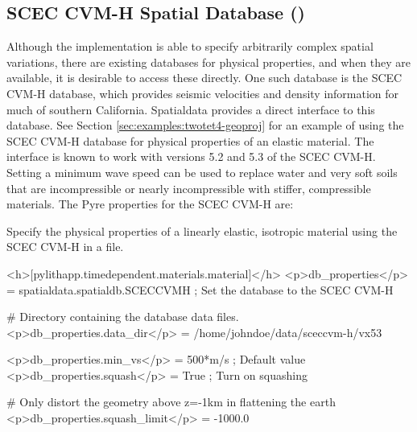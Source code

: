 \subsection{SCEC CVM-H Spatial Database ()}
\label{sec:SCEC:CVM-H}

Although the  implementation is able to specify arbitrarily
complex spatial variations, there are existing databases for physical
properties, and when they are available, it is desirable to access
these directly. One such database is the SCEC CVM-H database, which
provides seismic velocities and density information for much of southern
California. Spatialdata provides a direct interface to this database.
See Section \vref{sec:examples:twotet4-geoproj} for an example of
using the SCEC CVM-H database for physical properties of an elastic
material. The interface is known to work with versions 5.2 and 5.3
of the SCEC CVM-H. Setting a minimum wave speed can be used to replace
water and very soft soils that are incompressible or nearly incompressible
with stiffer, compressible materials. The Pyre properties for the
SCEC CVM-H are:
\begin{inventory}
\end{inventory}

Specify the physical properties of a linearly elastic, isotropic material
using the SCEC CVM-H in a  file.
\begin{cfg}
<h>[pylithapp.timedependent.materials.material]</h>
<p>db_properties</p> = spatialdata.spatialdb.SCECCVMH ; Set the database to the SCEC CVM-H

# Directory containing the database data files.
<p>db_properties.data_dir</p> = /home/johndoe/data/sceccvm-h/vx53

<p>db_properties.min_vs</p> = 500*m/s ; Default value
<p>db_properties.squash</p> = True ; Turn on squashing

# Only distort the geometry above z=-1km in flattening the earth
<p>db_properties.squash_limit</p> = -1000.0
\end{cfg}

